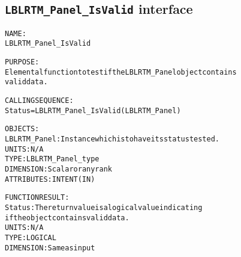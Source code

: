 \subsection{\texttt{LBLRTM\_Panel\_IsValid} interface}
  \label{sec:LBLRTM_Panel_IsValid_interface}
  \begin{alltt}
 
  NAME:
        LBLRTM_Panel_IsValid
 
  PURPOSE:
        Elemental function to test if the LBLRTM_Panel object contains
        valid data.
 
  CALLING SEQUENCE:
        Status = LBLRTM_Panel_IsValid( LBLRTM_Panel )
 
  OBJECTS:
        LBLRTM_Panel:  Instance which is to have its status tested.
                       UNITS:      N/A
                       TYPE:       LBLRTM_Panel_type
                       DIMENSION:  Scalar or any rank
                       ATTRIBUTES: INTENT(IN)
 
  FUNCTION RESULT:
        Status:        The return value is a logical value indicating
                       if the object contains valid data.
                       UNITS:      N/A
                       TYPE:       LOGICAL
                       DIMENSION:  Same as input
 
  \end{alltt}
